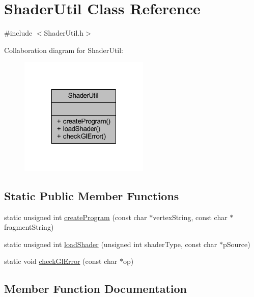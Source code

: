 \hypertarget{class_shader_util}{}\section{Shader\+Util Class Reference}
\label{class_shader_util}


{\ttfamily \#include $<$Shader\+Util.\+h$>$}



Collaboration diagram for Shader\+Util\+:\nopagebreak
\begin{figure}[H]
\begin{center}
\leavevmode
\includegraphics[width=175pt]{class_shader_util__coll__graph}
\end{center}
\end{figure}
\subsection*{Static Public Member Functions}
\begin{DoxyCompactItemize}
\item 
static unsigned int \hyperlink{class_shader_util_a1bcf8dcf6d12750db82a13321257a33e}{create\+Program} (const char $\ast$vertex\+String, const char $\ast$fragment\+String)
\item 
static unsigned int \hyperlink{class_shader_util_a5553f8c24c0182433c9bb3054035a376}{load\+Shader} (unsigned int shader\+Type, const char $\ast$p\+Source)
\item 
static void \hyperlink{class_shader_util_a3a0583a1b4016c3b30ed99a28ca2e6c9}{check\+Gl\+Error} (const char $\ast$op)
\end{DoxyCompactItemize}


\subsection{Member Function Documentation}
\mbox{\label{class_shader_util_a3a0583a1b4016c3b30ed99a28ca2e6c9}} 
